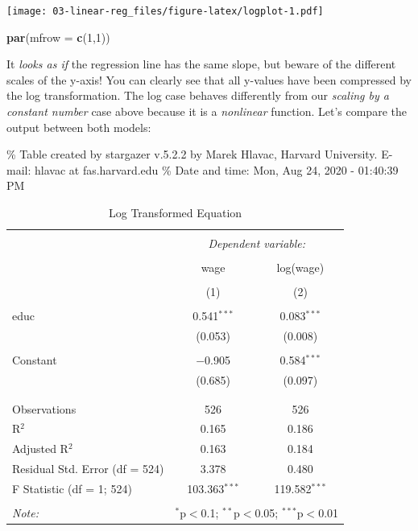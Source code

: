 \documentclass[]{book}
\newenvironment{Shaded}{\begin{snugshade}}{\end{snugshade}}
\newcommand{\KeywordTok}[1]{\textcolor[rgb]{0.13,0.29,0.53}{\textbf{#1}}}
\newcommand{\DataTypeTok}[1]{\textcolor[rgb]{0.13,0.29,0.53}{#1}}
\newcommand{\DecValTok}[1]{\textcolor[rgb]{0.00,0.00,0.81}{#1}}
\newcommand{\NormalTok}[1]{#1}
\begin{document}
\texttt{[image: 03-linear-reg\_files/figure-latex/logplot-1.pdf]}

\begin{Shaded}
\begin{Highlighting}[]
\KeywordTok{par}\NormalTok{(}\DataTypeTok{mfrow =} \KeywordTok{c}\NormalTok{(}\DecValTok{1}\NormalTok{,}\DecValTok{1}\NormalTok{))}
\end{Highlighting}
\end{Shaded}

It \emph{looks as if} the regression line has the same slope, but beware
of the different scales of the y-axis! You can clearly see that all
y-values have been compressed by the log transformation. The log case
behaves differently from our \emph{scaling by a constant number} case
above because it is a \emph{nonlinear} function. Let's compare the
output between both models:

\% Table created by stargazer v.5.2.2 by Marek Hlavac, Harvard
University. E-mail: hlavac at fas.harvard.edu \% Date and time: Mon, Aug
24, 2020 - 01:40:39 PM

\begin{table}[!htbp] \centering 
  \caption{Log Transformed Equation} 
  \label{} 
\begin{tabular}{@{\extracolsep{5pt}}lcc} 
\\[-1.8ex]\hline 
\hline \\[-1.8ex] 
 & \multicolumn{2}{c}{\textit{Dependent variable:}} \\ 
\cline{2-3} 
\\[-1.8ex] & wage & log(wage) \\ 
\\[-1.8ex] & (1) & (2)\\ 
\hline \\[-1.8ex] 
 educ & 0.541$^{***}$ & 0.083$^{***}$ \\ 
  & (0.053) & (0.008) \\ 
  & & \\ 
 Constant & $-$0.905 & 0.584$^{***}$ \\ 
  & (0.685) & (0.097) \\ 
  & & \\ 
\hline \\[-1.8ex] 
Observations & 526 & 526 \\ 
R$^{2}$ & 0.165 & 0.186 \\ 
Adjusted R$^{2}$ & 0.163 & 0.184 \\ 
Residual Std. Error (df = 524) & 3.378 & 0.480 \\ 
F Statistic (df = 1; 524) & 103.363$^{***}$ & 119.582$^{***}$ \\ 
\hline 
\hline \\[-1.8ex] 
\textit{Note:}  & \multicolumn{2}{r}{$^{*}$p$<$0.1; $^{**}$p$<$0.05; $^{***}$p$<$0.01} \\ 
\end{tabular} 
\end{table}
\end{document}
